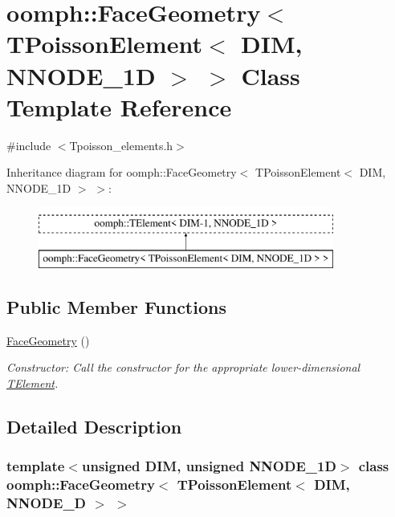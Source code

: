 \hypertarget{classoomph_1_1FaceGeometry_3_01TPoissonElement_3_01DIM_00_01NNODE__1D_01_4_01_4}{}\section{oomph\+:\+:Face\+Geometry$<$ T\+Poisson\+Element$<$ D\+IM, N\+N\+O\+D\+E\+\_\+1D $>$ $>$ Class Template Reference}
\label{classoomph_1_1FaceGeometry_3_01TPoissonElement_3_01DIM_00_01NNODE__1D_01_4_01_4}


{\ttfamily \#include $<$Tpoisson\+\_\+elements.\+h$>$}

Inheritance diagram for oomph\+:\+:Face\+Geometry$<$ T\+Poisson\+Element$<$ D\+IM, N\+N\+O\+D\+E\+\_\+1D $>$ $>$\+:\begin{figure}[H]
\begin{center}
\leavevmode
\includegraphics[height=2.000000cm]{classoomph_1_1FaceGeometry_3_01TPoissonElement_3_01DIM_00_01NNODE__1D_01_4_01_4}
\end{center}
\end{figure}
\subsection*{Public Member Functions}
\begin{DoxyCompactItemize}
\item 
\hyperlink{classoomph_1_1FaceGeometry_3_01TPoissonElement_3_01DIM_00_01NNODE__1D_01_4_01_4_a813c5c6300f9b2286e3b05219f513be2}{Face\+Geometry} ()
\begin{DoxyCompactList}\small\item\em Constructor\+: Call the constructor for the appropriate lower-\/dimensional \hyperlink{classoomph_1_1TElement}{T\+Element}. \end{DoxyCompactList}\end{DoxyCompactItemize}


\subsection{Detailed Description}
\subsubsection*{template$<$unsigned D\+IM, unsigned N\+N\+O\+D\+E\+\_\+1D$>$\newline
class oomph\+::\+Face\+Geometry$<$ T\+Poisson\+Element$<$ D\+I\+M, N\+N\+O\+D\+E\+\_\+D $>$ $>$}

